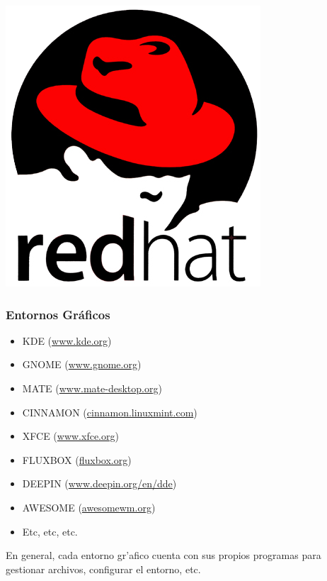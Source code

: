 \documentclass[hyperref={colorlinks}]{beamer}
\begin{document}
\begin{frame}
\begin{minipage}[b][.20\textheight][t]{.20\textwidth}
    \includegraphics[width=.7\textwidth]{figs/redhat.png}
    \end{minipage}
\end{frame}

\begin{frame}\frametitle{Entornos Gr\'aficos}
	\begin{block}{}
		\begin{itemize}
			\item KDE (\href{https://www.kde.org}{www.kde.org})
			\item GNOME (\href{https://www.gnome.org}{www.gnome.org})
			\item MATE (\href{https://www.mate-desktop.org}{www.mate-desktop.org})
			\item CINNAMON (\href{http://cinnamon.linuxmint.com}{cinnamon.linuxmint.com})
			\item XFCE (\href{https://www.xfce.org}{www.xfce.org})
			\item FLUXBOX (\href{http://fluxbox.org/}{fluxbox.org})
			\item DEEPIN (\href{https://www.deepin.org/en/dde/}{www.deepin.org/en/dde})
			\item AWESOME (\href{https://awesomewm.org/}{awesomewm.org})
			\item Etc, etc, etc. 
		\end{itemize}
	\end{block}
	\begin{block}{}
		En general, cada entorno gr'afico cuenta con sus propios programas para gestionar archivos, configurar el entorno, etc.
	\end{block}
\end{frame}
\end{document}
